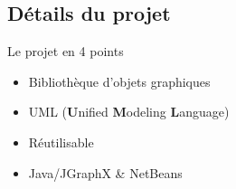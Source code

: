 \subsection{D\'etails du projet}
\begin{frame}{Le projet en 4 points}
  \begin{itemize}
	\item<1,2> Biblioth\`eque d'objets graphiques
	\item<1,3> UML (\textbf{U}nified \textbf{M}odeling \textbf{L}anguage)
	\item<1,4> R\'eutilisable
	\item<1,5> Java/JGraphX \& NetBeans
  \end{itemize}
\end{frame}


